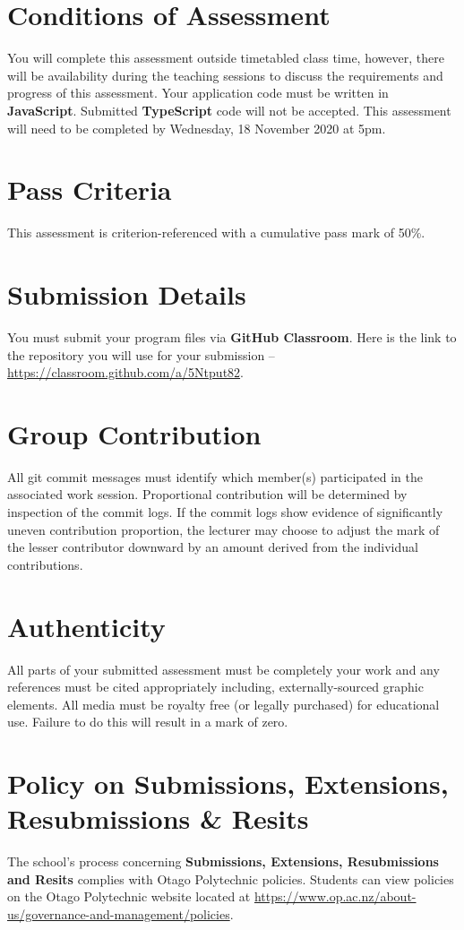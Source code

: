 \documentclass{article}
\begin{document}
\section*{Conditions of Assessment}
You will complete this assessment outside timetabled class time, however, there will be availability during the teaching sessions to discuss the requirements and progress of this assessment. Your application code must be written in \textbf{JavaScript}. Submitted \textbf{TypeScript} code will not be accepted. This assessment will need to be completed by Wednesday, 18 November 2020 at 5pm. 

\section*{Pass Criteria}
This assessment is criterion-referenced with a cumulative pass mark of 50\%.

\section*{Submission Details}
You must submit your program files via \textbf{GitHub Classroom}. Here is the link to the repository you will use for your submission – \href{https://classroom.github.com/a/5Ntput82}{https://classroom.github.com/a/5Ntput82}.

\section*{Group Contribution}
All git commit messages must identify which member(s) participated in the associated work session. Proportional contribution will be determined by inspection of the commit logs. If the commit logs show evidence of significantly uneven contribution proportion, the lecturer may choose to adjust the mark of the lesser contributor downward by an amount derived from the individual contributions.

\section*{Authenticity}
All parts of your submitted assessment must be completely your work and any references must be cited appropriately including, externally-sourced graphic elements. All media must be royalty free (or legally purchased) for educational use. Failure to do this will result in a mark of zero.

\section*{Policy on Submissions, Extensions, Resubmissions \& Resits}
The school's process concerning \textbf{Submissions, Extensions, Resubmissions and Resits} complies with Otago Polytechnic policies. Students can view policies on the Otago Polytechnic website located at \href{https://www.op.ac.nz/about-us/governance-and-management/policies}{https://www.op.ac.nz/about-us/governance-and-management/policies}.
\end{document}
